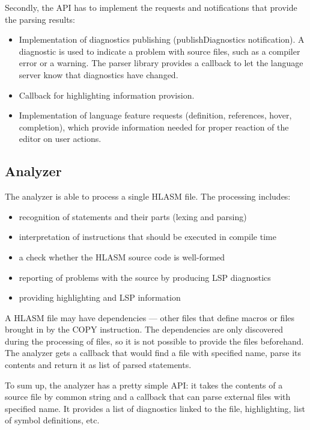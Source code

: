 Secondly, the API has to implement the requests and notifications that provide the parsing results:
\begin{itemize}
	\item Implementation of diagnostics publishing (publishDiagnostics notification). A diagnostic is used to indicate a problem with source files, such as a compiler error or a warning. The parser library provides a callback to let the language server know that diagnostics have changed.
	\item Callback for highlighting information provision.
	\item Implementation of language feature requests (definition, references, hover, completion), which provide information needed for proper reaction of the editor on user actions.
\end{itemize}

\subsection{Analyzer}

The analyzer is able to process a single HLASM file. The processing includes:
\begin{itemize}
 \item recognition of statements and their parts (lexing and parsing)
 \item interpretation of instructions that should be executed in compile time
 \item a check whether the HLASM source code is well-formed
 \item reporting of problems with the source by producing LSP diagnostics
 \item providing highlighting and LSP information
\end{itemize}

A HLASM file may have dependencies --- other files that define macros or files brought in by the COPY instruction. The dependencies are only discovered during the processing of files, so it is not possible to provide the files beforehand. The analyzer gets a callback that would find a file with specified name, parse its contents and return it as list of parsed statements. 

To sum up, the analyzer has a pretty simple API: it takes the contents of a source file by common string and a callback that can parse external files with specified name. It provides a list of diagnostics linked to the file, highlighting, list of symbol definitions, etc.

